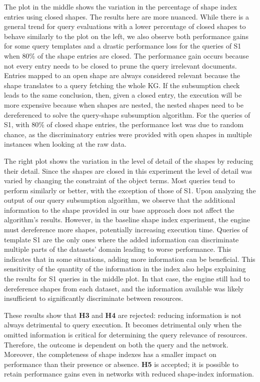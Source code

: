 The plot in the middle shows the variation in the percentage of shape index entries using closed shapes.
The results here are more nuanced.
While there is a general trend for query evaluations with a lower percentage of closed shapes to behave similarly to the plot on the left, we also observe both performance gains for some query templates and a drastic performance loss for the queries of S1 when 80\% of the shape entries are closed.
The performance gain occurs because not every entry needs to be closed to prune the query irrelevant documents.
Entries mapped to an open shape are always considered relevant because the shape translates to a query fetching the whole KG.
If the subsumption check leads to the same conclusion, then, given a closed entry, the execution will be more expensive because 
when shapes are nested, the nested shapes need to be dereferenced to solve the query-shape subsumption algorithm.
For the queries of S1, with 80\% of closed shape entries, the performance lost was due to random chance, as the discriminatory entries were provided with open shapes in multiple instances when looking at the raw data.

The right plot shows the variation in the level of detail of the shapes by reducing their detail.
Since the shapes are closed in this experiment the level of detail was varied by changing the constraint of the object terms.
Most queries tend to perform similarly or better, with the exception of those of S1.
Upon analyzing the output of our query subsumption algorithm, we observe that the additional information to the shape provided in our base approach does not affect the algorithm's results.
However, in the baseline shape index experiment, the engine must dereference more shapes, potentially increasing execution time.
Queries of template S1 are the only ones where the added information can discriminate multiple parts of the datasets' domain leading to worse performance.
This indicates that in some situations, adding more information can be beneficial.
This sensitivity of the quantity of the information in the index also helps explaining the results for S1 queries in the middle plot. 
In that case, the engine still had to dereference shapes from each dataset, and the information available was likely insufficient to significantly discriminate between resources.

These results show that \textbf{H3} and \textbf{H4} are rejected: reducing information is not always detrimental to query execution.
It becomes detrimental only when the omitted information is critical for determining the query relevance of resources. 
Therefore, the outcome is dependent on both the query and the network. 
Moreover, the completeness of shape indexes has a smaller impact on performance than their presence or absence.
\textbf{H5} is accepted; it is possible to retain performance gains even in networks with reduced shape-index information.


